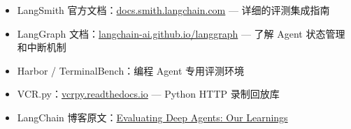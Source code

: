 \begin{itemize}
  \item LangSmith 官方文档：\href{https://docs.smith.langchain.com/}{docs.smith.langchain.com} --- 详细的评测集成指南
  \item LangGraph 文档：\href{https://langchain-ai.github.io/langgraph/}{langchain-ai.github.io/langgraph} --- 了解 Agent 状态管理和中断机制
  \item Harbor / TerminalBench：编程 Agent 专用评测环境
  \item VCR.py：\href{https://vcrpy.readthedocs.io/}{vcrpy.readthedocs.io} --- Python HTTP 录制回放库
  \item LangChain 博客原文：\href{https://blog.langchain.com/evaluating-deep-agents-our-learnings/}{Evaluating Deep Agents: Our Learnings}
\end{itemize}



